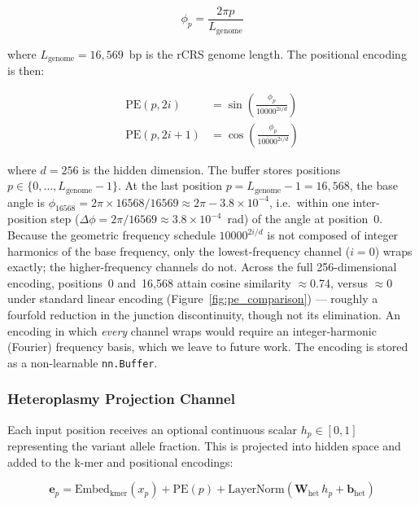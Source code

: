 \documentclass[10pt]{article}
\begin{document}
\begin{equation}
\phi_p = \frac{2\pi p}{L_\text{genome}}
\label{eq:circular_angle}
\end{equation}

where $L_\text{genome} = 16,569$~bp is the rCRS genome length. The positional encoding is then:

\begin{align}
\text{PE}(p, 2i) &= \sin\!\left(\frac{\phi_p}{10000^{2i/d}}\right) \\
\text{PE}(p, 2i+1) &= \cos\!\left(\frac{\phi_p}{10000^{2i/d}}\right)
\end{align}

where $d = 256$ is the hidden dimension. The buffer stores positions $p \in \{0, \ldots, L_\text{genome}-1\}$.
At the last position $p = L_\text{genome} - 1 = 16{,}568$, the base angle is
$\phi_{16568} = 2\pi \times 16568/16569 \approx 2\pi - 3.8\times10^{-4}$, i.e.\ within one
inter-position step ($\Delta\phi = 2\pi/16569 \approx 3.8\times10^{-4}$~rad) of the angle at
position~0. Because the geometric frequency schedule $10000^{2i/d}$ is not composed of integer
harmonics of the base frequency, only the lowest-frequency channel ($i=0$) wraps exactly; the
higher-frequency channels do not. Across the full 256-dimensional encoding, positions~0 and~16,568
attain cosine similarity $\approx$0.74, versus $\approx$0 under standard linear encoding
(Figure~\ref{fig:pe_comparison}) --- roughly a fourfold reduction in the junction discontinuity,
though not its elimination. An encoding in which \emph{every} channel wraps would require an
integer-harmonic (Fourier) frequency basis, which we leave to future work. The encoding is stored
as a non-learnable \texttt{nn.Buffer}.

\subsubsection{Heteroplasmy Projection Channel}

Each input position receives an optional continuous scalar $h_p \in [0,1]$ representing the
variant allele fraction. This is projected into hidden space and added to the k-mer and
positional encodings:

\begin{equation}
\mathbf{e}_p = \text{Embed}_\text{kmer}(x_p) + \text{PE}(p) + \text{LayerNorm}(\mathbf{W}_\text{het}\, h_p + \mathbf{b}_\text{het})
\label{eq:het_channel}
\end{equation}
\end{document}
